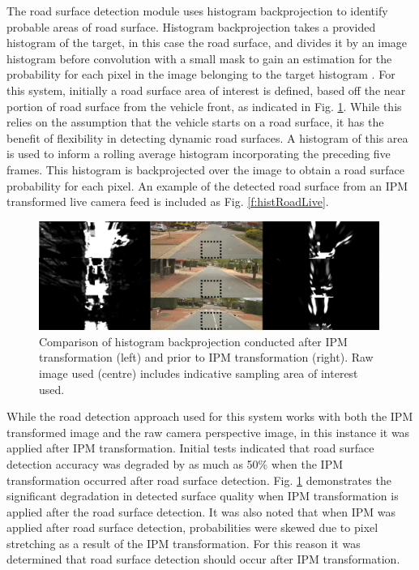 \documentclass[]{aiaa-tc}%
\begin{document}
The road surface detection module uses histogram backprojection to identify probable areas of road surface. Histogram backprojection takes a provided histogram of the target, in this case the road surface, and divides it by an image histogram before convolution with a small mask to gain an estimation for the probability for each pixel in the image belonging to the target histogram \citep{histBackImageIndexing}. For this system, initially a road surface area of interest is defined, based off the near portion of road surface from the vehicle front, as indicated in Fig. \ref{f:histIPMcompare}. While this relies on the assumption that the vehicle starts on a road surface, it has the benefit of flexibility in detecting dynamic road surfaces. A histogram of this area is used to inform a rolling average histogram incorporating the preceding five frames. This histogram is backprojected over the image to obtain a road surface probability for each pixel. An example of the detected road surface from an IPM transformed live camera feed is included as Fig. \ref{f:histRoadLive}. 

\begin{figure}
	\includegraphics[width=0.99\textwidth]{RoadDetection/histIPMcompare.png}
	\caption{Comparison of histogram backprojection conducted after IPM transformation (left) and prior to IPM transformation (right). Raw image used (centre) includes indicative sampling area of interest used.}
	\label{f:histIPMcompare}
\end{figure}

While the road detection approach used for this system works with both the IPM transformed image and the raw camera perspective image, in this instance it was applied after IPM transformation. Initial tests indicated that road surface detection accuracy was degraded by as much as 50\% when the IPM transformation occurred after road surface detection. Fig. \ref{f:histIPMcompare} demonstrates the significant degradation in detected surface quality when IPM transformation is applied after the road surface detection. It was also noted that when IPM was applied after road surface detection, probabilities were skewed due to pixel stretching as a result of the IPM transformation. For this reason it was determined that road surface detection should occur after IPM transformation.
\end{document}
